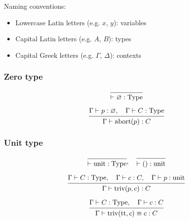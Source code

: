 \documentclass[conference]{IEEEtran}
\begin{document}
\newcommand{\type}{\textrm{Type}}

Naming conventions:

\begin{itemize}
    \item Lowercase Latin letters (e.g. $x$, $y$): variables
    \item Capital Latin letters (e.g. $A$, $B$): types
    \item Capital Greek letters (e.g. $\Gamma$, $\Delta$): contexts
\end{itemize}

\vspace{10pt}

\subsubsection{Zero type}

\[
\begin{prooftree}
    \hypo { }
    \infer1 { \vdash \varnothing : \type }
\end{prooftree}
\]

\[
\begin{prooftree}
    \hypo { \Gamma \vdash p : \varnothing, \quad \Gamma \vdash C : \type }
    \infer1 { \Gamma \vdash \textrm{abort}(p) : C }
\end{prooftree}
\]

\subsubsection{Unit type}

\[
\begin{prooftree}
    \hypo { }
    \infer1 { \vdash \textrm{unit} : \type }
\end{prooftree}
, \quad
\begin{prooftree}
    \hypo { }
    \infer1 { \vdash \textrm{()} : \textrm{unit} }
\end{prooftree}
\]

\[
\begin{prooftree}
    \hypo { \Gamma \vdash C : \type, \quad \Gamma \vdash c : C, \quad \Gamma \vdash p : \textrm{unit} }
    \infer1 { \Gamma \vdash \textrm{triv}(p, c) : C }
\end{prooftree}
\]

\[
\begin{prooftree}
    \hypo { \Gamma \vdash C : \type, \quad \Gamma \vdash c : C }
    \infer1 { \Gamma \vdash \textrm{triv}(\textrm{tt}, c) \equiv c : C }
\end{prooftree}
\]
\end{document}
